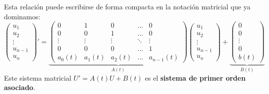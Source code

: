 Esta relación puede escribirse de forma compacta en la notación matricial que ya dominamos:
\[
    \begin{pmatrix} u_1 \\ u_2 \\ \vdots \\ u_{n-1} \\ u_n \end{pmatrix}' = 
    \underbrace{\begin{pmatrix} 
    0 & 1 & 0 & \dots & 0 \\
    0 & 0 & 1 & \dots & 0 \\
    \vdots & \vdots & \vdots & \ddots & \vdots \\
    0 & 0 & 0 & \dots & 1 \\
    a_0(t) & a_1(t) & a_2(t) & \dots & a_{n-1}(t)
    \end{pmatrix}}_{A(t)}
    \begin{pmatrix} u_1 \\ u_2 \\ \vdots \\ u_{n-1} \\ u_n \end{pmatrix} + 
    \underbrace{\begin{pmatrix} 0 \\ 0 \\ \vdots \\ 0 \\ b(t) \end{pmatrix}}_{B(t)}
\]
Este sistema matricial $U' = A(t)U + B(t)$ es el \textbf{sistema de primer orden asociado}.

